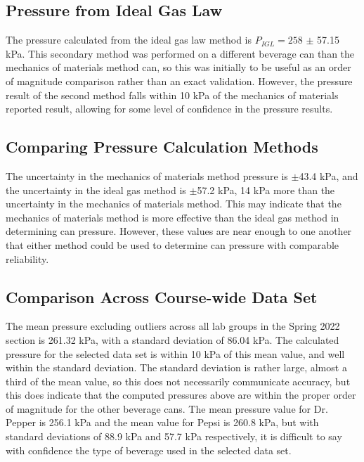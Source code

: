 \documentclass[10pt,journal,letterpaper]{IEEEtran}
\begin{document}
\subsection{Pressure from Ideal Gas Law}

The pressure calculated from the ideal gas law method is $P_{IGL}=258$ $\pm$ 57.15 kPa.
This secondary method was performed on a different beverage can than the mechanics of materials method can, so this was initially to be useful as an order of magnitude comparison rather than an exact validation.
However, the pressure result of the second method falls within 10 kPa of the mechanics of materials reported result, allowing for some level of confidence in the pressure results.

\subsection{Comparing Pressure Calculation Methods}

The uncertainty in the mechanics of materials method pressure is $\pm$43.4 kPa, and the uncertainty in the ideal gas method is $\pm$57.2 kPa, 14 kPa more than the uncertainty in the mechanics of materials method.
This may indicate that the mechanics of materials method is more effective than the ideal gas method in determining can pressure.
However, these values are near enough to one another that either method could be used to determine can pressure with comparable reliability.

\subsection{Comparison Across Course-wide Data Set}

The mean pressure excluding outliers across all lab groups in the Spring 2022 section is 261.32 kPa, with a standard deviation of 86.04 kPa.
The calculated pressure for the selected data set is within 10 kPa of this mean value, and well within the standard deviation.
The standard deviation is rather large, almost a third of the mean value, so this does not necessarily communicate accuracy, but this does indicate that the computed pressures above are within the proper order of magnitude for the other beverage cans.
The mean pressure value for Dr. Pepper is 256.1 kPa and the mean value for Pepsi is 260.8 kPa, but with standard deviations of 88.9 kPa and 57.7 kPa respectively, it is difficult to say with confidence the type of beverage used in the selected data set.
\end{document}
